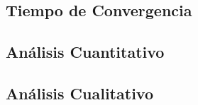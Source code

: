 \subsection{Tiempo de Convergencia}

\subsection{Análisis Cuantitativo}

\subsection{Análisis Cualitativo}
